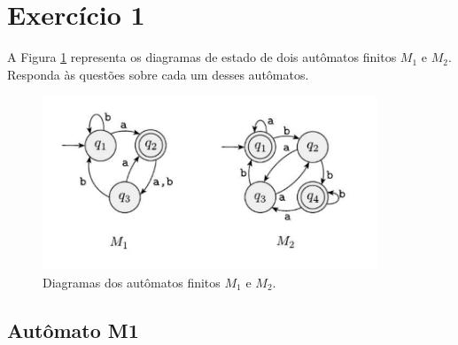 \documentclass[a4paper, 12pt]{article}
\begin{document}
\newpage
\tableofcontents
\thispagestyle{empty}

\newpage
{}

\newpage
\section{Exercício 1}

A Figura \ref{fig:m1_m2} representa os diagramas de estado de dois autômatos finitos $M_1$ e $M_2$. Responda às questões sobre cada um desses autômatos.

\begin{figure}[!ht]
    \centering
    \includegraphics[width=10cm]{./imgs/img1.png}
    \caption{Diagramas dos autômatos finitos $M_1$ e $M_2$.}
    \label{fig:m1_m2}
\end{figure}

\subsection{Autômato M1}
\end{document}
